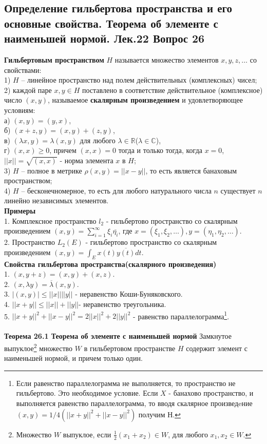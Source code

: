 \documentclass{article}
\begin{document}
\subsection{Определение гильбертова пространства и его основные свойства. Теорема об элементе с наименьшей нормой. Лек.22 \textbf{Вопрос 26}}
	\textbf{Гильбертовым пространством} $H$ называется множество
	элементов $x,y,z,\ldots$ со свойствами:\\
	1) $H$ – линейное пространство над полем действительных (комплексных)
	чисел;\\
	2) каждой паре $x,y\in H$ поставлено в соответствие действительное
	(комплексное) число $(x,y)$, называемое \textbf{скалярным произведением} и удовлетворяющее условиям:\\
	а) $(x,y)=(y,x)$,\\
	б) $(x+z,y)=(x,y)+(z,y)$,\\
	в) $(\lambda x,y)=\lambda(x,y)$ для любого $\lambda \in \mathbb{R}$($\lambda \in \mathbb{C}$),\\
	г) $(x,x)\ge 0$, причем $(x,x)=0$ тогда и только тогда, когда $x=0$,\\
	$||x||=\sqrt{(x,x)}$ - норма элемента $x$ в $H$;\\
	3) $H$ – полное в метрике $\rho(x,y)=||x-y||$, то есть является банаховым пространством;\\
	4) $H$ – бесконечномерное, то есть для любого натурального числа
	$n$ существует $n$ линейно независимых элементов.\\
	\textbf{Примеры}\\
	1. Комплексное пространство ${l}_{2}$ - гильбертово пространство со скалярным произведением $(x,y)=\sum_{i=1}^{\infty} {\xi}_{i}\overline{{\eta}_{i}}$, где $x=({\xi}_{1},{\xi}_{2},\ldots),y=({\eta}_{1},{\eta}_{2},\ldots)$.\\
	2. Пространство ${L}_{2}(E)$ - гильбертово пространство со
	скалярным произведением $(x,y)=\int_{E}x(t)\overline{y(t)}dt$.\\
	\textbf{Свойства гильбертова пространства(скалярного произведения)}\\
	1. $(x,y+z)=(x,y)+(x,z)$.\\
	2. $(x,\lambda y)=\overline{\lambda}(x,y)$.\\
	3. $|(x,y)|\le ||x||||y||$ - неравенство Коши-Буняковского.\\
	4. $||x+y||\le ||x||+||y||$- неравенство треугольника.\\
	5. ${||x+y||}^{2}+{||x-y||}^{2}=2{||x||}^{2}+2{||y||}^{2}$ - равенство параллелограмма\footnote{Если равенство параллелограмма не выполняется, то пространство не гильбертово. Это необходимое условие. Если $X$ - банахово пространство, и выполняется равенство параллелограмма, то вводя скалярное произведeние $(x,y)=1/4({||x+y||}^{2}+{||x-y||}^{2})$ получим Н.}.\\
	\\
	\textbf{Теорема 26.1 Теорема об элементе с наименьшей нормой} Замкнутое выпуклое\footnote{Множество $W$ выпуклое, если $\frac{1}{2}({x}_{1}+{x}_{2})\in W$, для любого ${x}_{1},{x}_{2}\in W$.} множество $W$ в гильбертовом пространстве $H$ содержит элемент с наименьшей нормой, и причем только один.\\
\end{document}
